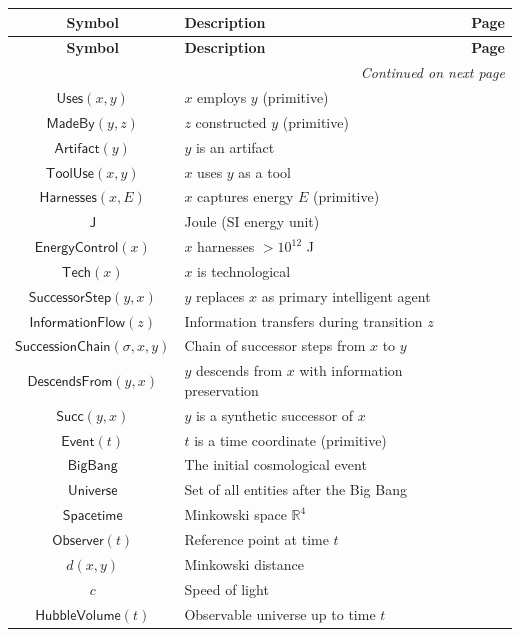 \documentclass{amsart}
\newenvironment{glossarytable}{%
	\renewcommand{\arraystretch}{1.3}%
	\setlength{\tabcolsep}{4pt}%
	\begin{longtable}{|c|l|c|}
		\hline
		\textbf{Symbol} & \textbf{Description} & \textbf{Page} \\
		\hline
		\endfirsthead
		\hline
		\textbf{Symbol} & \textbf{Description} & \textbf{Page} \\
		\hline
		\endhead
		\hline
		\multicolumn{3}{r}{\textit{Continued on next page}} \\
		\endfoot
		\hline
		\endlastfoot
	}{%
	\end{longtable}%
}
\theoremstyle{break}
\newcommand{\R}{\mathbb{R}}
\newcommand{\Technological}[1]{\mathsf{Tech}(#1)}
\newcommand{\Successor}[2]{\mathsf{Succ}(#1,#2)}
\begin{document}
\begin{glossarytable}
	$\mathsf{Uses}(x,y)$ & $x$ employs $y$ (primitive) & \pageref{def:uses} \\
	$\mathsf{MadeBy}(y,z)$ & $z$ constructed $y$ (primitive) & \pageref{def:madeby} \\
	$\mathsf{Artifact}(y)$ & $y$ is an artifact & \pageref{def:artifact} \\
	$\mathsf{ToolUse}(x,y)$ & $x$ uses $y$ as a tool & \pageref{def:tooluse} \\
	$\mathsf{Harnesses}(x,E)$ & $x$ captures energy $E$ (primitive) & \pageref{def:harnesses} \\
	$\mathsf{J}$ & Joule (SI energy unit) & \pageref{def:joule} \\
	$\mathsf{EnergyControl}(x)$ & $x$ harnesses $>10^{12}$ J & \pageref{def:energycontrol} \\
	$\Technological{x}$ & $x$ is technological & \pageref{def:tech} \\
	
	$\mathsf{SuccessorStep}(y,x)$ & $y$ replaces $x$ as primary intelligent agent & \pageref{def:successorstep} \\
	$\mathsf{InformationFlow}(z)$ & Information transfers during transition $z$ & \pageref{def:informationflow} \\
	$\mathsf{SuccessionChain}(\sigma,x,y)$ & Chain of successor steps from $x$ to $y$ & \pageref{def:successionchain} \\
	$\mathsf{DescendsFrom}(y,x)$ & $y$ descends from $x$ with information preservation & \pageref{def:descendsfrom} \\
	$\Successor{y}{x}$ & $y$ is a synthetic successor of $x$ & \pageref{def:successor} \\
	
	$\mathsf{Event}(t)$ & $t$ is a time coordinate (primitive) & \pageref{def:event} \\
	$\mathsf{BigBang}$ & The initial cosmological event & \pageref{def:bigbang} \\
	$\mathsf{Universe}$ & Set of all entities after the Big Bang & \pageref{def:universe} \\
	$\mathsf{Spacetime}$ & Minkowski space $\R^4$ & \pageref{def:spacetime} \\
	$\mathsf{Observer}(t)$ & Reference point at time $t$ & \pageref{def:observer} \\
	$d(x,y)$ & Minkowski distance & \pageref{def:distance} \\
	$c$ & Speed of light & \pageref{def:speedoflight} \\
	$\mathsf{HubbleVolume}(t)$ & Observable universe up to time $t$ & \pageref{def:hubblevolume} \\
	

\end{glossarytable}
\end{document}
